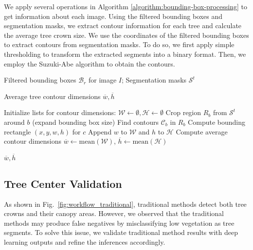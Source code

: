 \documentclass{article}
\begin{document}
We apply several operations in Algorithm \ref{algorithm:bounding-box-processing} to get information about each image. Using the filtered bounding boxes and segmentation masks, we extract contour information for each tree and calculate the average tree crown size. We use the coordinates of the filtered bounding boxes to extract contours from segmentation masks. To do so, we first apply simple thresholding to transform the extracted segments into a binary format. Then, we employ the Suzuki-Abe algorithm to obtain the contours.

\begin{algorithm}[htbp]
\caption{Step 2: Bounding box processing.}\label{algorithm:bounding-box-processing}
\begin{algorithmic}[1]

\Require 
\begin{itemize}
Filtered bounding boxes $\mathcal{B}_r$ for image $I$; Segmentation masks $\mathcal{S}^t$
\end{itemize}
\Ensure 
Average tree contour dimensions $\overline{w}, \overline{h}$

\State Initialize lists for contour dimensions: $\mathcal{W} \gets \emptyset, \mathcal{H} \gets \emptyset$
    \State Crop region $R_b$ from $\mathcal{S}^t$ around $b$ (expand bounding box size)
    \State Find contours $\mathcal{C}_b$ in $R_b$
        \State Compute bounding rectangle $(x, y, w, h)$ for $c$
        \State Append $w$ to $\mathcal{W}$ and $h$ to $\mathcal{H}$
    \EndFor
\EndFor
\State Compute average contour dimensions $\overline{w} \gets \text{mean}(\mathcal{W})$, $\overline{h} \gets \text{mean}(\mathcal{H})$

\State \Return $\overline{w}, \overline{h}$

\end{algorithmic}
\end{algorithm}

\subsection{Tree Center Validation}

As shown in Fig.~\ref{fig:workflow_traditional}, traditional methods detect both tree crowns and their canopy areas. However, we observed that the traditional methods may produce false negatives by misclassifying low vegetation as tree segments. To solve this issue, we validate traditional method results with deep learning outputs and refine the inferences accordingly.
\end{document}
